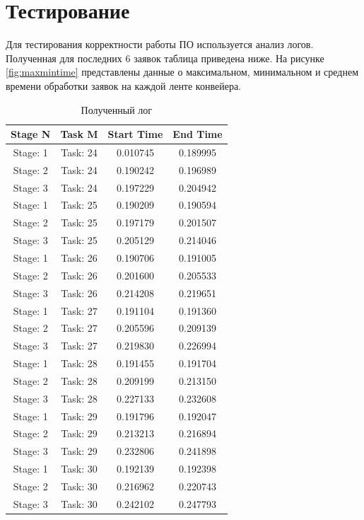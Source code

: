 \documentclass[a4paper,oneside,14pt]{extreport}
\begin{document}
\section{Тестирование}
Для тестирования корректности работы ПО используется анализ логов. Полученная для последних 6 заявок таблица приведена ниже. На рисунке \ref{fig:maxmintime} представлены данные о максимальном, минимальном и среднем времени обработки заявок на каждой ленте конвейера.
%
\begin{table}[H]
	\begin{center}
		\captionsetup{justification=raggedleft, singlelinecheck=false}
		\caption[]{\label{tab:tests} Полученный лог}
		\begin{tabular}{|c|c|c|c|}
			\hline
			Stage N & Task M & Start Time & End Time\\
			\hline
			Stage: 1 & Task: 24 & 0.010745 & 0.189995 \\
			Stage: 2 & Task: 24 & 0.190242 & 0.196989 \\
			Stage: 3 & Task: 24 & 0.197229 & 0.204942 \\
			\hline
			Stage: 1 & Task: 25 & 0.190209 & 0.190594 \\
			Stage: 2 & Task: 25 & 0.197179 & 0.201507 \\
			Stage: 3 & Task: 25 & 0.205129 & 0.214046 \\
			\hline
			Stage: 1 & Task: 26 & 0.190706 & 0.191005 \\
			Stage: 2 & Task: 26 & 0.201600 & 0.205533 \\
			Stage: 3 & Task: 26 & 0.214208 & 0.219651 \\
			\hline
			Stage: 1 & Task: 27 & 0.191104 & 0.191360 \\
			Stage: 2 & Task: 27 & 0.205596 & 0.209139 \\
			Stage: 3 & Task: 27 & 0.219830 & 0.226994 \\
			\hline
			Stage: 1 & Task: 28 & 0.191455 & 0.191704 \\
			Stage: 2 & Task: 28 & 0.209199 & 0.213150 \\
			Stage: 3 & Task: 28 & 0.227133 & 0.232608 \\
			\hline
			Stage: 1 & Task: 29 & 0.191796 & 0.192047 \\
			Stage: 2 & Task: 29 & 0.213213 & 0.216894 \\
			Stage: 3 & Task: 29 & 0.232806 & 0.241898 \\
			\hline
			Stage: 1 & Task: 30 & 0.192139 & 0.192398 \\
			Stage: 2 & Task: 30 & 0.216962 & 0.220743 \\
			Stage: 3 & Task: 30 & 0.242102 & 0.247793 \\
			\hline
		\end{tabular}
	\end{center}
\end{table}
\end{document}
